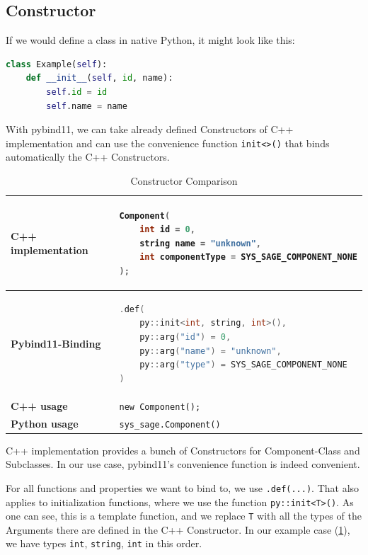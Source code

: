 \subsection{Constructor}

If we would define a class in native Python, it might look like this:

\begin{lstlisting}[language=Python, xleftmargin=4em, frame = single]
class Example(self):
    def __init__(self, id, name):
        self.id = id
        self.name = name
\end{lstlisting}

With pybind11, we can take already defined Constructors of C++ implementation and can use the convenience function \verb|init<>()| that binds automatically the C++ Constructors. \cite[see The Basics/Object-Oriented Code]{pybind11-docu}

\begin{table}[htbp]
\centering
\begin{tabular}{|l|l|}
\hline
\textbf{C++ implementation} &
\begin{lstlisting}[language=C++]
Component(
    int id = 0,
    string name = "unknown",
    int componentType = SYS_SAGE_COMPONENT_NONE
);
\end{lstlisting}
\\ \hline
\textbf{Pybind11-Binding} &
\begin{lstlisting}[language=C++]
.def(
    py::init<int, string, int>(),
    py::arg("id") = 0,
    py::arg("name") = "unknown",
    py::arg("type") = SYS_SAGE_COMPONENT_NONE
)
\end{lstlisting}
\\ \hline
\textbf{C++ usage} &
\verb|new Component();| \\ \hline
\textbf{Python usage} &
\verb|sys_sage.Component()| \\ \hline
\end{tabular}
\caption{Constructor Comparison}
\label{tab:constructor}
\end{table}

C++ implementation provides a bunch of Constructors for Component-Class and Subclasses. In our use case, pybind11's convenience function is indeed convenient.

For all functions and properties we want to bind to, we use \verb|.def(...)|. That also applies to initialization functions, where we use the function \verb|py::init<T>()|. As one can see, this is a template function, and we replace \verb|T| with all the types of the Arguments there are defined in the C++ Constructor. In our example case (\ref{tab:constructor}), we have types \verb|int|, \verb|string|, \verb|int| in this order. \cite[see The Basics/Object-Oriented Code]{pybind11-docu}

